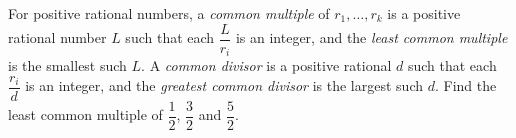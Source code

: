 For positive rational numbers, a \emph{common multiple} of $r_1,\ldots,r_k$ is a positive rational number $L$ such that each $\dfrac{L}{r_i}$ is an integer, and the \emph{least common multiple} is the smallest such $L$. A \emph{common divisor} is a positive rational $d$ such that each $\dfrac{r_i}{d}$ is an integer, and the \emph{greatest common divisor} is the largest such $d$. Find the least common multiple of $\dfrac{1}{2}$, $\dfrac{3}{2}$ and $\dfrac{5}{2}$.
